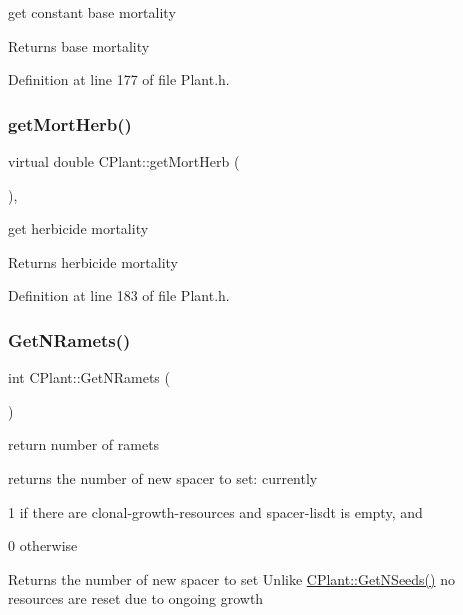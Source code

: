 get constant base mortality \begin{DoxyReturn}{Returns}
base mortality 
\end{DoxyReturn}


Definition at line 177 of file Plant.\+h.

\mbox{\label{class_c_plant_a7f215cff30196620f8a22e494f5f61ca}} 
\subsubsection{\texorpdfstring{getMortHerb()}{getMortHerb()}}
{\footnotesize\ttfamily virtual double C\+Plant\+::get\+Mort\+Herb (\begin{DoxyParamCaption}{ }\end{DoxyParamCaption})\hspace{0.3cm}{\ttfamily [inline]}, {\ttfamily [virtual]}}

get herbicide mortality \begin{DoxyReturn}{Returns}
herbicide mortality 
\end{DoxyReturn}


Definition at line 183 of file Plant.\+h.

\mbox{\label{class_c_plant_a4f815871e13536e1e4f78a34e7ed2ef3}} 
\subsubsection{\texorpdfstring{GetNRamets()}{GetNRamets()}}
{\footnotesize\ttfamily int C\+Plant\+::\+Get\+N\+Ramets (\begin{DoxyParamCaption}{ }\end{DoxyParamCaption})\hspace{0.3cm}{\ttfamily [virtual]}}



return number of ramets 

returns the number of new spacer to set\+: currently
\begin{DoxyItemize}
\item 1 if there are clonal-\/growth-\/resources and spacer-\/lisdt is empty, and
\item 0 otherwise \begin{DoxyReturn}{Returns}
the number of new spacer to set Unlike \mbox{\hyperlink{class_c_plant_a0e6da4d0343dc1cceae34118ca8e2a3f}{C\+Plant\+::\+Get\+N\+Seeds()}} no resources are reset due to ongoing growth 
\end{DoxyReturn}

\end{DoxyItemize}

